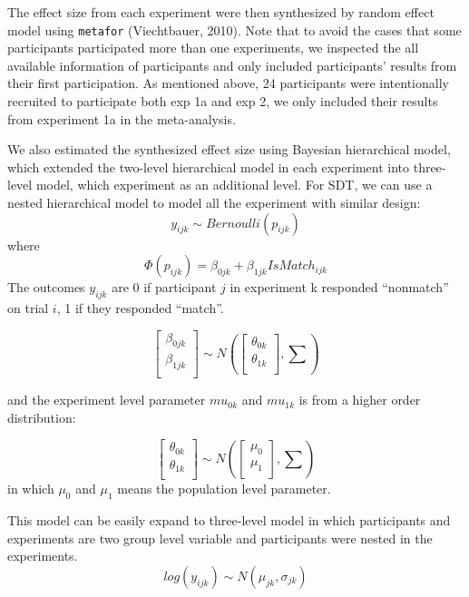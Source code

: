 \documentclass[
  english,
  man]{apa6}
\begin{document}
The effect size from each experiment were then synthesized by random effect model using \texttt{metafor} (Viechtbauer, 2010). Note that to avoid the cases that some participants participated more than one experiments, we inspected the all available information of participants and only included participants' results from their first participation. As mentioned above, 24 participants were intentionally recruited to participate both exp 1a and exp 2, we only included their results from experiment 1a in the meta-analysis.

We also estimated the synthesized effect size using Bayesian hierarchical model, which extended the two-level hierarchical model in each experiment into three-level model, which experiment as an additional level. For SDT, we can use a nested hierarchical model to model all the experiment with similar design:
\[y_{ijk} \sim Bernoulli(p_{ijk})\]
where
\[ \Phi(p_{ijk}) =  \beta_{0jk} + \beta_{1jk}IsMatch_{ijk}\]
The outcomes \(y_{ijk}\) are 0 if participant \(j\) in experiment k responded \enquote{nonmatch} on trial \(i\), 1 if they responded \enquote{match}.

\[\begin{bmatrix}\beta_{0jk}\\
\beta_{1jk}\\
\end{bmatrix} \sim N(\begin{bmatrix}\theta_{0k}\\
\theta_{1k}\\
\end{bmatrix}, \sum)\]

and the experiment level parameter \(mu_{0k}\) and \(mu_{1k}\) is from a higher order distribution:

\[\begin{bmatrix}\theta_{0k}\\
\theta_{1k}\\
\end{bmatrix} \sim N(\begin{bmatrix}\mu_{0}\\
\mu_{1}\\
\end{bmatrix}, \sum)\]
in which \(\mu_{0}\) and \(\mu_{1}\) means the population level parameter.

This model can be easily expand to three-level model in which participants and experiments are two group level variable and participants were nested in the experiments.
\[ log(y_{ijk}) \sim N(\mu_{jk}, \sigma_{jk})\]
\end{document}
